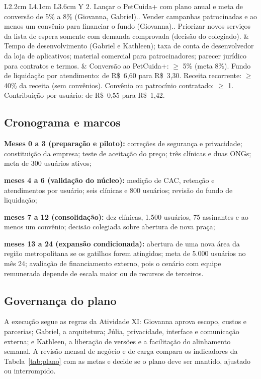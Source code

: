 \begin{table}[htb]
\begin{tabularx}{\textwidth}{L{2.2cm} L{4.1cm} L{3.6cm} Y}
2. Lançar o PetCuida+ com plano anual e meta de conversão de 5\% a 8\% (Giovanna, Gabriel).. Vender campanhas patrocinadas e ao menos um convênio para financiar o fundo (Giovanna).. Priorizar novos serviços da lista de espera somente com demanda comprovada (decisão do colegiado). &
Tempo de desenvolvimento (Gabriel e Kathleen); taxa de conta de desenvolvedor da loja de aplicativos; material comercial para patrocinadores; parecer jurídico para contratos e termos. &
Conversão ao PetCuida+: $\ge$ 5\% (meta 8\%).\newline
Fundo de liquidação por atendimento: de R\$~6,60 para R\$~3,30.\newline
Receita recorrente: $\ge$ 40\% da receita (sem convênios).\newline
Convênio ou patrocínio contratado: $\ge$ 1.\newline
Contribuição por usuário: de R\$~0,55 para R\$~1,42.\\
\bottomrule
\end{tabularx}
\fonteautores
\end{table}

\subsection{Cronograma e marcos}

\begin{alineas}
  \item \textbf{Meses 0 a 3 (preparação e piloto):} correções de segurança e privacidade; constituição da empresa; teste de aceitação do preço; três clínicas e duas ONGs; meta de 300 usuários ativos;
  \item \textbf{meses 4 a 6 (validação do núcleo):} medição de CAC, retenção e atendimentos por usuário; seis clínicas e 800 usuários; revisão do fundo de liquidação;
  \item \textbf{meses 7 a 12 (consolidação):} dez clínicas, 1.500 usuários, 75 assinantes e ao menos um convênio; decisão colegiada sobre abertura de nova praça;
  \item \textbf{meses 13 a 24 (expansão condicionada):} abertura de uma nova área da região metropolitana se os gatilhos forem atingidos; meta de 5.000 usuários no mês 24; avaliação de financiamento externo, pois o cenário com equipe remunerada depende de escala maior ou de recursos de terceiros.
\end{alineas}

\subsection{Governança do plano}

A execução segue as regras da Atividade XI: Giovanna aprova escopo, custos e parcerias; Gabriel, a arquitetura; Júlia, privacidade, interface e comunicação externa; e Kathleen, a liberação de versões e a facilitação do alinhamento semanal. A revisão mensal de negócio e de carga compara os indicadores da Tabela~\ref{tab:plano} com as metas e decide se o plano deve ser mantido, ajustado ou interrompido.
